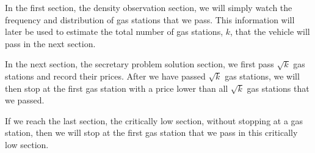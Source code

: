 In the first section, the density observation section, we will simply watch the frequency and distribution of gas stations that we pass. This information will later be used to estimate the total number of gas stations, $k$, that the vehicle will pass in the next section.

In the next section, the secretary problem solution section, we first pass $\sqrt{k}$ gas stations and record their prices. After we have passed $\sqrt{k}$ gas stations, we will then stop at the first gas station with a price lower than all $\sqrt{k}$ gas stations that we passed.

If we reach the last section, the critically low section, without stopping at a gas station, then we will stop at the first gas station that we pass in this critically low section.

